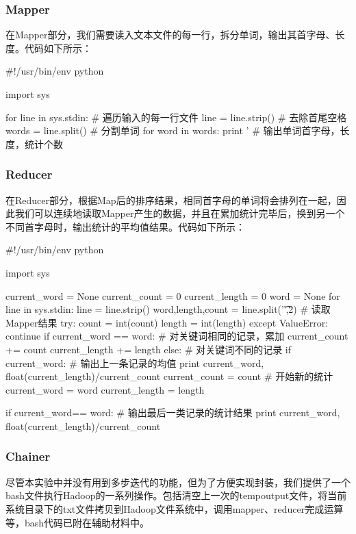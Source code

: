 \documentclass{article}
\begin{document}
\subsubsection{Mapper}
在Mapper部分，我们需要读入文本文件的每一行，拆分单词，输出其首字母、长度。代码如下所示：
\begin{python}
#!/usr/bin/env python

import sys

for line in sys.stdin:        # 遍历输入的每一行文件
    line = line.strip()       # 去除首尾空格
    words = line.split()      # 分割单词
    for word in words:
        print '%
                              # 输出单词首字母，长度，统计个数
\end{python}

\subsubsection{Reducer}
在Reducer部分，根据Map后的排序结果，相同首字母的单词将会排列在一起，因此我们可以连续地读取Mapper产生的数据，并且在累加统计完毕后，换到另一个不同首字母时，输出统计的平均值结果。代码如下所示：
\begin{python}
#!/usr/bin/env python

import sys

current_word = None
current_count = 0
current_length = 0
word = None
for line in sys.stdin:
    line = line.strip()
    word,length,count = line.split('\t',2)  # 读取Mapper结果
    try:
        count = int(count)
        length = int(length)
    except ValueError:
        continue
    if current_word == word:      # 对关键词相同的记录，累加
        current_count += count
        current_length += length
    else:                         # 对关键词不同的记录
        if current_word:          # 输出上一条记录的均值
            print current_word, float(current_length)/current_count
        current_count = count     # 开始新的统计
        current_word = word
        current_length = length

if current_word== word:           # 输出最后一类记录的统计结果
    print current_word, float(current_length)/current_count
\end{python}

\subsubsection{Chainer}
尽管本实验中并没有用到多步迭代的功能，但为了方便实现封装，我们提供了一个bash文件执行Hadoop的一系列操作。包括清空上一次的tempoutput文件，将当前系统目录下的txt文件拷贝到Hadoop文件系统中，调用mapper、reducer完成运算等，bash代码已附在辅助材料中。
\end{document}
